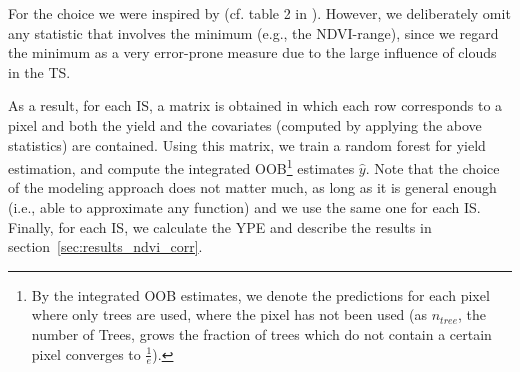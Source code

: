 {{{                %
        }
        For the choice we were inspired by (cf. table 2 in \cite{kamirEstimatingWheatYields2020}). However, we deliberately omit any statistic that involves the minimum (e.g., the NDVI-range), since we regard the minimum as a very error-prone measure due to the large influence of clouds in the {TS}. 
        
        As a result, for each {{IS}}, a matrix is obtained in which each row corresponds to a pixel and both the yield and the covariates (computed by applying the above statistics) are contained.
        Using this matrix, we train a random forest for yield estimation, and compute the integrated OOB\footnote{By the integrated OOB estimates, we denote the predictions for each pixel where only trees are used, where the pixel has not been used (as $n_{tree}$, the number of Trees, grows the fraction of trees which do not contain a certain pixel converges to $\frac{1}{e}$).} estimates $\hat y$. Note that the choice of the modeling approach does not matter much, as long as it is general enough (i.e., able to approximate any function) and we use the same one for each {{IS}}. 
        Finally, for each {{IS}}, we calculate the YPE and describe the results in section~\ref{sec:results_ndvi_corr}.
    }

    
    
    
}



